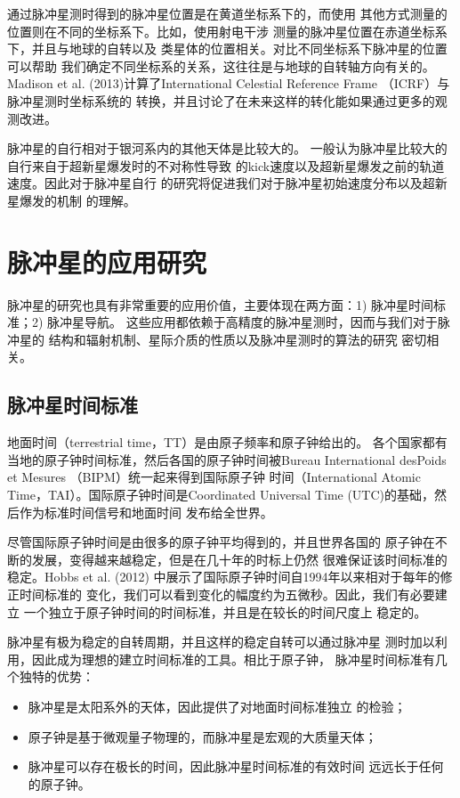 通过脉冲星测时得到的脉冲星位置是在黄道坐标系下的，而使用
其他方式测量的位置则在不同的坐标系下。比如，使用射电干涉
测量的脉冲星位置在赤道坐标系下，并且与地球的自转以及
类星体的位置相关。对比不同坐标系下脉冲星的位置可以帮助
我们确定不同坐标系的关系，这往往是与地球的自转轴方向有关的。
Madison et al. (2013)\supercite{Madison13}计算了International 
Celestial Reference Frame （ICRF）与脉冲星测时坐标系统的
转换，并且讨论了在未来这样的转化能如果通过更多的观测改进。

脉冲星的自行相对于银河系内的其他天体是比较大的\supercite{hobbs}。
一般认为脉冲星比较大的自行来自于超新星爆发时的不对称性导致
的kick速度以及超新星爆发之前的轨道速度。因此对于脉冲星自行
的研究将促进我们对于脉冲星初始速度分布以及超新星爆发的机制
的理解。

\section{脉冲星的应用研究}

脉冲星的研究也具有非常重要的应用价值，主要体现在两方面：1) 
脉冲星时间标准\supercite{hcm+12}；2) 脉冲星导航\supercite{dhy+13}。
这些应用都依赖于高精度的脉冲星测时，因而与我们对于脉冲星的
结构和辐射机制、星际介质的性质以及脉冲星测时的算法的研究
密切相关。

\subsection{脉冲星时间标准}

地面时间（terrestrial time，TT）是由原子频率和原子钟给出的。
各个国家都有当地的原子钟时间标准，然后各国的原子钟时间被Bureau 
International desPoids et Mesures （BIPM）统一起来得到国际原子钟
时间（International Atomic Time，TAI）。国际原子钟时间是Coordinated 
Universal Time (UTC)的基础，然后作为标准时间信号和地面时间
发布给全世界。

尽管国际原子钟时间是由很多的原子钟平均得到的，并且世界各国的
原子钟在不断的发展，变得越来越稳定，但是在几十年的时标上仍然
很难保证该时间标准的稳定。Hobbs et al. (2012)\supercite{hcm+12}
中展示了国际原子钟时间自1994年以来相对于每年的修正时间标准的
变化，我们可以看到变化的幅度约为五微秒。因此，我们有必要建立
一个独立于原子钟时间的时间标准，并且是在较长的时间尺度上
稳定的。

脉冲星有极为稳定的自转周期，并且这样的稳定自转可以通过脉冲星
测时加以利用，因此成为理想的建立时间标准的工具。相比于原子钟，
脉冲星时间标准有几个独特的优势：
\begin{itemize}
\item 脉冲星是太阳系外的天体，因此提供了对地面时间标准独立
的检验；
\item 原子钟是基于微观量子物理的，而脉冲星是宏观的大质量天体；
\item 脉冲星可以存在极长的时间，因此脉冲星时间标准的有效时间
远远长于任何的原子钟。
\end{itemize}


